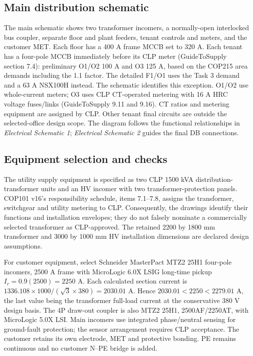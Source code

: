 \subsection*{Main distribution schematic}
The main schematic shows two transformer incomers, a normally-open interlocked bus coupler, separate floor and plant feeders, tenant controls and meters, and the customer MET. Each floor has a 400 A frame MCCB set to 320 A. Each tenant has a four-pole MCCB immediately before its CLP meter (GuideToSupply section 7.4): preliminary O1/O2 100 A and O3 125 A, based on the COP215 area demands including the 1.1 factor. The detailed F1/O1 uses the Task 3 demand and a 63 A NSX100H instead. The schematic identifies this exception. O1/O2 use whole-current meters; O3 uses CLP CT-operated metering with 16 A HRC voltage fuses/links (GuideToSupply 9.11 and 9.16). CT ratios and metering equipment are assigned by CLP. Other tenant final circuits are outside the selected-office design scope. The diagram follows the functional relationships in \emph{Electrical Schematic 1}; \emph{Electrical Schematic 2} guides the final DB connections.

\subsection*{Equipment selection and checks}
The utility supply equipment is specified as two CLP 1500 kVA distribution-transformer units and an HV incomer with two transformer-protection panels. COP101 v16's responsibility schedule, items 7.1--7.8, assigns the transformer, switchgear and utility metering to CLP. Consequently, the drawings identify their functions and installation envelopes; they do not falsely nominate a commercially selected transformer as CLP-approved. The retained 2200 by 1800 mm transformer and 3000 by 1000 mm HV installation dimensions are declared design assumptions.

For customer equipment, select Schneider MasterPact MTZ2 25H1 four-pole incomers, 2500 A frame with MicroLogic 6.0X LSIG long-time pickup $I_r=0.9(2500)=2250$ A. Each calculated section current is $1336.108\times1000/(\sqrt3\times380)=2030.01$ A. Hence $2030.01<2250<2279.01$ A, the last value being the transformer full-load current at the conservative 380 V design basis. The 4P draw-out coupler is also MTZ2 25H1, 2500AF/2250AT, with MicroLogic 5.0X LSI. Main incomers use integrated phase/neutral sensing for ground-fault protection; the sensor arrangement requires CLP acceptance. The customer retains its own electrode, MET and protective bonding. PE remains continuous and no customer N--PE bridge is added.

